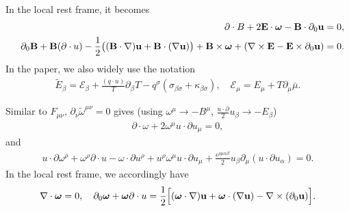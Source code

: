 \documentclass[aps,prd,showkeys,preprint,amsmath,amssymb,nofootinbib]{revtex4-1}
\begin{document}
In the local rest frame, it becomes 
\begin{eqnarray}
 &  & \partial\cdot B+2{\bf E}\cdot\bm{\omega}-{\bf B}\cdot\partial_{0}{\bf u}=0,\nonumber \\
 &  & \partial_{0}{\bf B}+{\bf B}(\partial\cdot u)-\frac{1}{2}\big({\bf (B\cdot\nabla)u}+{\bf B}\cdot(\nabla{\bf u})\big)+{\bf B\times\bm{\omega}}+(\nabla\times{\bf E}-{\bf E}\times\partial_{0}{\bf u})=0.
\end{eqnarray}
In the paper, we also widely use the notation 
\begin{eqnarray}
\tilde{E}_{\beta}=\mathcal{E}_{\beta}+\frac{(q\cdot u)}{T}\partial_{\beta}T-q^{\sigma}(\sigma_{\beta\sigma}+\kappa_{\beta\sigma}),\quad\mathcal{E}_{\mu}=E_{\mu}+T\partial_{\mu}\bar{\mu}.
\end{eqnarray}

Similar to $F_{\mu\nu}$, $\partial_{\nu}\tilde{\omega}^{\mu\nu}=0$
gives (using $\omega^{\mu}\rightarrow-B^{\mu}$, $\frac{u\cdot\partial}{2}u_{\beta}\rightarrow-E_{\beta}$)
\begin{eqnarray}
\partial\cdot\omega+2\omega^{\mu}u\cdot\partial u_{\mu}=0,
\end{eqnarray}
and 
\begin{eqnarray}
u\cdot\partial\omega^{\rho}+\omega^{\rho}\partial\cdot u-\omega\cdot\partial u^{\rho}+u^{\rho}\omega^{\mu}u\cdot\partial u_{\mu}+\frac{\epsilon^{\rho\mu\alpha\beta}}{2}u_{\beta}\partial_{\mu}(u\cdot\partial u_{\alpha})=0.\label{eq:domega1}
\end{eqnarray}
In the local rest frame, we accordingly have 
\begin{eqnarray}\label{domega2}
\nabla\cdot\bm{\omega}%
=0,\quad\partial_{0}\bm{\omega}+\bm{\omega}\partial\cdot u=\frac{1}{2}\Big[{\bf (\bm{\omega}\cdot\nabla)u}+\bm{\omega}\cdot(\nabla{\bf  u})-\nabla\times(\partial_{0}{\bf u})\Big].
\end{eqnarray}
\end{document}
